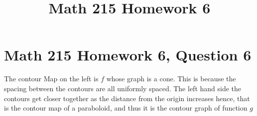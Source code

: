 \documentclass{article}
\title{Math 215 Homework 6}
\begin{document}
\section{Math 215 Homework 6, Question 6}

The contour Map on the left is $f$ whose graph is a cone. This is because the spacing between the contours are all uniformly spaced. The left hand side the contours get closer together as the distance from the origin increases hence, that is the contour map of a paraboloid, and thus it is the contour graph of function $g$
\end{document}
